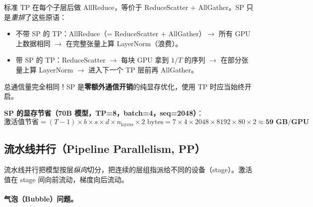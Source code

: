 \begin{intuitionbox}[SP 通信是 ``免费'' 的]
标准 TP 在每个子层后做 AllReduce，等价于 ReduceScatter + AllGather。SP 只是\emph{重排}了这些原语：

\begin{itemize}
  \item 不带 SP 的 TP：AllReduce（= ReduceScatter + AllGather）$\rightarrow$ 所有 GPU 上数据相同 $\rightarrow$ 在完整张量上算 LayerNorm（浪费）。
  \item 带 SP 的 TP：ReduceScatter $\rightarrow$ 每块 GPU 拿到 $1/T$ 的序列 $\rightarrow$ 在部分张量上算 LayerNorm $\rightarrow$ 进入下一个 TP 层前再 AllGather。
\end{itemize}

总通信量完全相同！SP 是\textbf{零额外通信开销}的纯显存优化，使用 TP 时应当始终开启。
\end{intuitionbox}

\textbf{SP 的显存节省（70B 模型，TP=8，batch=4，seq=2048）}：
\begin{equation}
\text{激活值节省} = (T-1) \times b \times s \times d \times n_\text{layers} \times 2\text{ bytes} = 7 \times 4 \times 2048 \times 8192 \times 80 \times 2 \approx \textbf{59 GB/GPU}
\end{equation}

\subsection{流水线并行（Pipeline Parallelism, PP）}
\label{subsec:pipeline-parallel}

流水线并行把模型按层\emph{纵向}切分，把连续的层组指派给不同的设备（stage）。激活值在 stage 间向前流动，梯度向后流动。

\paragraph{气泡（Bubble）问题。}
\label{the-bubble-problem.}

